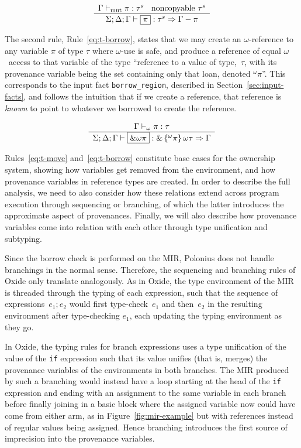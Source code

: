 \documentclass[11pt,a4paper,twoside,openany]{report}
\newcommand{\InRust}[1]{\texttt{#1}}
\newcommand{\InDatalog}[1]{\texttt{#1}}
\newcommand{\expression}[1]{\boxed{#1}}
\newcommand{\ntyperule}[2]{\begin{array}{c}#1\\\hline\raisebox{1pt}{\strut}#2\end{array}}
\begin{document}
\begin{equation}\label{eq:t-move}
  \ntyperule{
    \Gamma \vdash_{\text{mut}} \pi : \tau^s \:\:\:\:
    \text{noncopyable } \tau^s}
  {
    \Sigma ; \Delta ; \Gamma \vdash \expression{\pi} : \tau^s \Rightarrow \Gamma - \pi
  }
\end{equation}

The second rule, Rule~\eqref{eq:t-borrow}, states that we may create an
$\omega$-reference to any variable $\pi$ of type $\tau$ where $\omega$-use is
safe, and produce a reference of equal $\omega$~access to that variable of the
type ``reference to a value of type,~$\tau$, with its provenance variable being
the set containing only that loan, denoted $^{\omega}\pi$''. This corresponds to
the input fact \InDatalog{borrow_region}, described in
Section~\ref{sec:input-facts}, and follows the intuition that if we create a
reference, that reference is \emph{known} to point to whatever we borrowed to
create the reference.

\begin{equation}\label{eq:t-borrow}
  \ntyperule{
    \Gamma \vdash_{\omega} \pi : \tau}
  {
    \Sigma ; \Delta ; \Gamma \vdash \expression{\&\omega \pi} : \& \left \{ ^{\omega}\pi\right \} \omega \tau \Rightarrow \Gamma
  }
\end{equation}

Rules~\eqref{eq:t-move} and~\eqref{eq:t-borrow} constitute base cases for the
ownership system, showing how variables get removed from the environment, and
how provenance variables in reference types are created. In order to describe
the full analysis, we need to also consider how these relations extend across
program execution through sequencing or branching, of which the latter
introduces the approximate aspect of provenances. Finally, we will also describe
how provenance variables come into relation with each other through type
unification and subtyping.

Since the borrow check is performed on the MIR, Polonius does not handle
branchings in the normal sense. Therefore, the sequencing and branching rules of
Oxide only translate analogously. As in Oxide, the type environment of the MIR
is threaded through the typing of each expression, such that the sequence of
expressions~$\expression{e_1; e_2}$ would first type-check~$e_1$ and then~$e_2$
in the resulting environment after type-checking $e_1$, each updating the typing
environment as they go.

In Oxide, the typing rules for branch expressions uses a type unification of the
value of the \InRust{if} expression such that its value unifies (that is,
merges) the provenance variables of the environments in both branches. The MIR
produced by such a branching would instead have a loop starting at the head of
the \InRust{if} expression and ending with an assignment to the same variable in
each branch before finally joining in a basic block where the assigned variable
now could have come from either arm, as in Figure~\ref{fig:mir-example} but with
references instead of regular values being assigned. Hence branching introduces
the first source of imprecision into the provenance variables.
\end{document}
